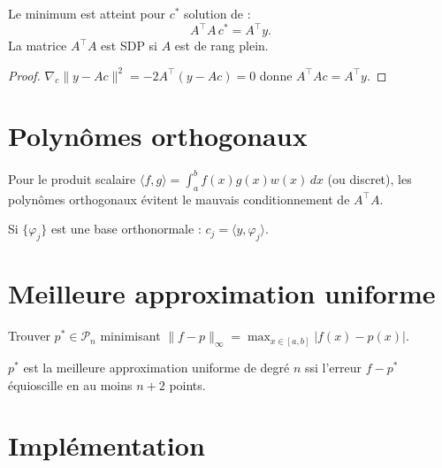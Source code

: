 \begin{theoreme}
Le minimum est atteint pour $c^*$ solution de :
\[
A^\top A\,c^* = A^\top y.
\]
La matrice $A^\top A$ est SDP si $A$ est de rang plein.
\end{theoreme}

\begin{proof}
$\nabla_c\|y-Ac\|^2=-2A^\top(y-Ac)=0$ donne $A^\top Ac=A^\top y$.
\end{proof}

\section{Polyn\^omes orthogonaux}

\begin{definition}
Pour le produit scalaire $\langle f,g\rangle=\int_a^b f(x)g(x)w(x)\,dx$ (ou discret), les polyn\^omes orthogonaux \'evitent le mauvais conditionnement de $A^\top A$.
\end{definition}

\begin{theoreme}
Si $\{\varphi_j\}$ est une base orthonormale : $c_j=\langle y,\varphi_j\rangle$.
\end{theoreme}

\section{Meilleure approximation uniforme}

\begin{definition}
Trouver $p^*\in\mathcal{P}_n$ minimisant $\|f-p\|_\infty=\max_{x\in[a,b]}|f(x)-p(x)|$.
\end{definition}

\begin{theoreme}
$p^*$ est la meilleure approximation uniforme de degr\'e $n$ ssi l'erreur $f-p^*$ \'equioscille en au moins $n+2$ points.
\end{theoreme}

\section{Impl\'ementation}

